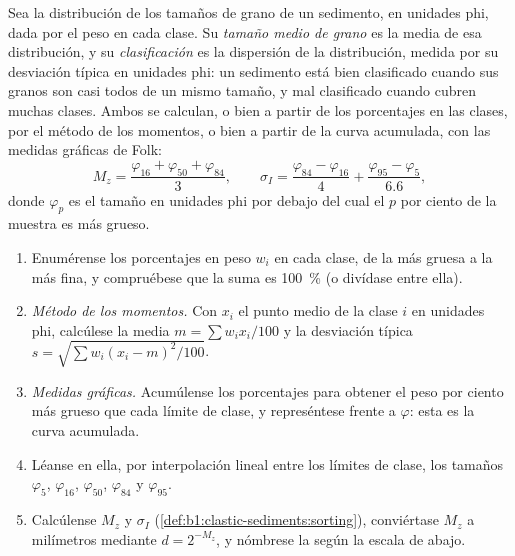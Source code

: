 \begin{definition}\label{def:b1:clastic-sediments:sorting}
Sea la distribución de los tamaños de grano de un sedimento, en unidades phi, dada por el peso en cada clase. Su \emph{tamaño medio de grano}
es la media de esa distribución, y su \emph{clasificación} es la dispersión de la distribución, medida por su desviación típica en unidades phi: un
sedimento está bien clasificado cuando sus granos son casi todos de un mismo tamaño, y mal clasificado cuando cubren muchas clases. Ambos se calculan, o bien a
partir de los porcentajes en las clases, por el método de los momentos, o bien a partir de la curva acumulada, con las medidas gráficas de Folk:
\[
  M_z = \frac{\varphi_{16} + \varphi_{50} + \varphi_{84}}{3}, \qquad
  \sigma_I = \frac{\varphi_{84} - \varphi_{16}}{4} + \frac{\varphi_{95} - \varphi_{5}}{6.6},
\]
donde $\varphi_p$ es el tamaño en unidades phi por debajo del cual el $p$ por ciento de la muestra es más grueso.
\end{definition}

\begin{method}\label{met:b1:clastic-sediments:graphic}
\begin{enumerate}
  \item Enumérense los porcentajes en peso $w_i$ en cada clase, de la más gruesa a la más fina, y compruébese que la suma es \qty{100}{\percent} (o divídase entre ella).
  \item \emph{Método de los momentos.} Con $x_i$ el punto medio de la clase $i$ en unidades phi, calcúlese la media $m = \sum w_i x_i / 100$ y la desviación típica
        $s = \sqrt{\sum w_i (x_i - m)^2 / 100}$.
  \item \emph{Medidas gráficas.} Acumúlense los porcentajes para obtener el peso por ciento más grueso que cada límite de clase, y represéntese frente a $\varphi$:
        esta es la curva acumulada.
  \item Léanse en ella, por interpolación lineal entre los límites de clase, los tamaños $\varphi_5$, $\varphi_{16}$, $\varphi_{50}$, $\varphi_{84}$ y
        $\varphi_{95}$.
  \item Calcúlense $M_z$ y $\sigma_I$ (\cref{def:b1:clastic-sediments:sorting}), conviértase $M_z$ a milímetros mediante $d = 2^{-M_z}$, y nómbrese la 
        según la escala de abajo.
\end{enumerate}
\end{method}

